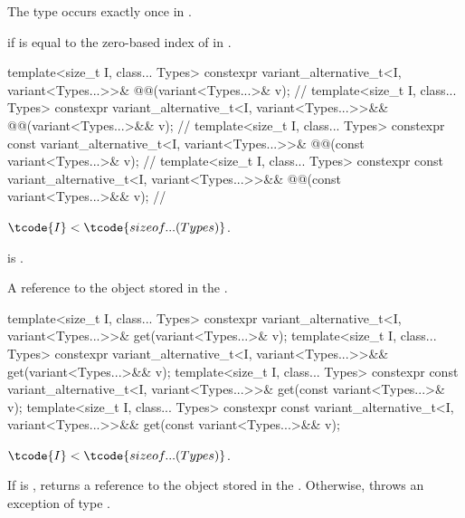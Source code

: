 \begin{itemdescr}
\pnum
\mandates
The type  occurs exactly once in .

\pnum
\returns
{} if  is equal to the zero-based index of  in .
\end{itemdescr}

\begin{itemdecl}
template<size_t I, class... Types>
  constexpr variant_alternative_t<I, variant<Types...>>&
    @@(variant<Types...>& v);                                  // \expos
template<size_t I, class... Types>
  constexpr variant_alternative_t<I, variant<Types...>>&&
    @@(variant<Types...>&& v);                                 // \expos
template<size_t I, class... Types>
  constexpr const variant_alternative_t<I, variant<Types...>>&
    @@(const variant<Types...>& v);                            // \expos
template<size_t I, class... Types>
  constexpr const variant_alternative_t<I, variant<Types...>>&&
    @@(const variant<Types...>&& v);                           // \expos
\end{itemdecl}

\begin{itemdescr}
\pnum
\mandates
$\tcode{I} < \tcode{sizeof...(Types)}$.

\pnum
\expects
{} is .

\pnum
\returns
A reference to the object stored in the .
\end{itemdescr}

%
\begin{itemdecl}
template<size_t I, class... Types>
  constexpr variant_alternative_t<I, variant<Types...>>& get(variant<Types...>& v);
template<size_t I, class... Types>
  constexpr variant_alternative_t<I, variant<Types...>>&& get(variant<Types...>&& v);
template<size_t I, class... Types>
  constexpr const variant_alternative_t<I, variant<Types...>>& get(const variant<Types...>& v);
template<size_t I, class... Types>
  constexpr const variant_alternative_t<I, variant<Types...>>&& get(const variant<Types...>&& v);
\end{itemdecl}

\begin{itemdescr}
\pnum
\mandates
$\tcode{I} < \tcode{sizeof...(Types)}$.

\pnum
\effects
If  is , returns a reference to the object stored in
the . Otherwise, throws an exception of type .
\end{itemdescr}

